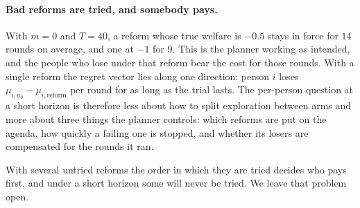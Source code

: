 \paragraph{Bad reforms are tried, and somebody pays.} With $m=0$ and $T=40$, a reform whose true welfare is $-0.5$ stays in force for $14$ rounds on average, and one at $-1$ for $9$. This is the planner working as intended, and the people who lose under that reform bear the cost for those rounds. With a single reform the regret vector lies along one direction: person $i$ loses $\mu_{i,a_0}-\mu_{i,\text{reform}}$ per round for as long as the trial lasts. The per-person question at a short horizon is therefore less about how to split exploration between arms and more about three things the planner controls: which reforms are put on the agenda, how quickly a failing one is stopped, and whether its losers are compensated for the rounds it ran.

With several untried reforms the order in which they are tried decides who pays first, and under a short horizon some will never be tried. We leave that problem open.
